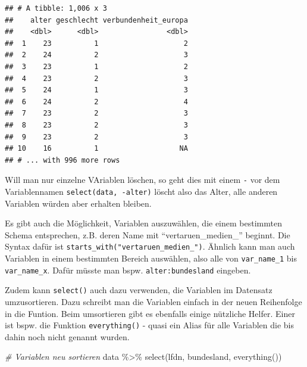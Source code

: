 \documentclass[
]{book}
\newenvironment{Shaded}{\begin{snugshade}}{\end{snugshade}}
\newcommand{\CommentTok}[1]{\textcolor[rgb]{0.56,0.35,0.01}{\textit{#1}}}
\newcommand{\FunctionTok}[1]{\textcolor[rgb]{0.00,0.00,0.00}{#1}}
\newcommand{\NormalTok}[1]{#1}
\newcommand{\SpecialCharTok}[1]{\textcolor[rgb]{0.00,0.00,0.00}{#1}}
\begin{document}
\begin{verbatim}
## # A tibble: 1,006 x 3
##    alter geschlecht verbundenheit_europa
##    <dbl>      <dbl>                <dbl>
##  1    23          1                    2
##  2    24          2                    3
##  3    23          1                    2
##  4    23          2                    3
##  5    24          1                    3
##  6    24          2                    4
##  7    23          2                    3
##  8    23          2                    3
##  9    23          2                    3
## 10    16          1                   NA
## # ... with 996 more rows
\end{verbatim}

Will man nur einzelne VAriablen löschen, so geht dies mit einem \texttt{-} vor dem Variablennamen \texttt{select(data,\ -alter)} löscht also das Alter, alle anderen Variablen würden aber erhalten bleiben.

Es gibt auch die Möglichkeit, Variablen auszuwählen, die einem bestimmten Schema entsprechen, z.B. deren Name mit ``vertaruen\_medien\_'' beginnt. Die Syntax dafür ist \texttt{starts\_with("vertaruen\_medien\_")}. Ähnlich kann man auch Variablen in einem bestimmten Bereich auswählen, also alle von \texttt{var\_name\_1} bis \texttt{var\_name\_x}. Dafür müsste man bspw. \texttt{alter:bundesland} eingeben.

Zudem kann \texttt{select()} auch dazu verwenden, die Variablen im Datensatz umzusortieren. Dazu schreibt man die Variablen einfach in der neuen Reihenfolge in die Funtion. Beim umsortieren gibt es ebenfalls einige nützliche Helfer. Einer ist bspw. die Funktion \texttt{everything()} - quasi ein Alias für alle Variablen die bis dahin noch nicht genannt wurden.

\begin{Shaded}
\begin{Highlighting}[]
\CommentTok{\# Variablen neu sortieren}
\NormalTok{data }\SpecialCharTok{\%\textgreater{}\%} 
  \FunctionTok{select}\NormalTok{(lfdn, bundesland, }\FunctionTok{everything}\NormalTok{())}
\end{Highlighting}
\end{Shaded}
\end{document}
